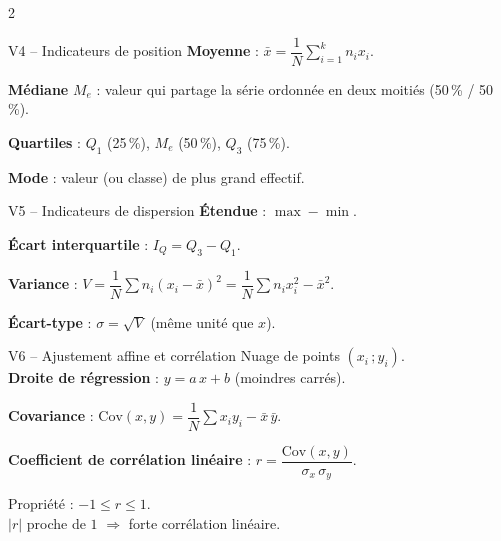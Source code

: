 \documentclass[11pt,a4paper]{article}
\begin{document}
\begin{multicols}{2}
\begin{vignetteCours}{V4 -- Indicateurs de position}
\textbf{Moyenne} : $\bar{x} = \dfrac{1}{N}\displaystyle\sum_{i=1}^{k} n_i x_i$.

\medskip
\textbf{Médiane} $M_e$ : valeur qui partage la série ordonnée en deux moitiés (50\,\% / 50\,\%).

\medskip
\textbf{Quartiles} : $Q_1$ (25\,\%), $M_e$ (50\,\%), $Q_3$ (75\,\%).

\medskip
\textbf{Mode} : valeur (ou classe) de plus grand effectif.
\end{vignetteCours}

\begin{vignetteCours}{V5 -- Indicateurs de dispersion}
\textbf{Étendue} : $\max - \min$.

\medskip
\textbf{Écart interquartile} : $I_Q = Q_3 - Q_1$.

\medskip
\textbf{Variance} : 
$V = \dfrac{1}{N}\displaystyle\sum n_i(x_i-\bar{x})^2
= \dfrac{1}{N}\sum n_i x_i^2 - \bar{x}^2$.

\medskip
\textbf{Écart-type} : $\sigma = \sqrt{V}$ (même unité que $x$).
\end{vignetteCours}

\begin{vignetteCours}{V6 -- Ajustement affine et corrélation}
Nuage de points $(x_i\,;y_i)$.\\
\textbf{Droite de régression} : $y = a\,x + b$ (moindres carrés).

\medskip
\textbf{Covariance} :
$\mathrm{Cov}(x,y)=\dfrac{1}{N}\sum x_i y_i - \bar{x}\,\bar{y}$.

\medskip
\textbf{Coefficient de corrélation linéaire} :
$r = \dfrac{\mathrm{Cov}(x,y)}{\sigma_x\,\sigma_y}$.

\medskip
Propriété : $-1 \le r \le 1$.\\
$|r|$ proche de $1$ $\Rightarrow$ forte corrélation linéaire.
\end{vignetteCours}

\end{multicols}

\newpage
\end{document}
